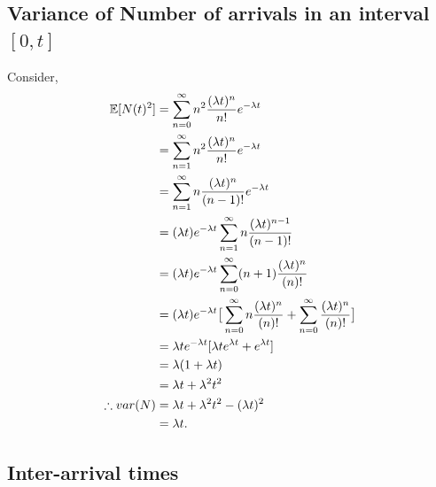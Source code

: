 \documentclass[11pt, a4paper]{report}
\begin{document}

\subsection{Variance of Number of arrivals in an interval $
[0, t]$}
Consider,
\begin{subequations}
    \begin{align}
        {\mathbb{E}}[N(t)^2] &= \sum_{n=0}^{\infty} n^2 \frac{(\lambda t)^n}{n!}e^{-\lambda t} \\
        &= \sum_{n=1}^{\infty} n^2 \frac{(\lambda t)^n}{n!}e^{-\lambda t} \\
        &= \sum_{n=1}^{\infty} n \frac{(\lambda t)^n}{(n-1)!}e^{-\lambda t} \\
        &= (\lambda t)e^{-\lambda t} \sum_{n=1}^{\infty}n \frac{(\lambda t)^{n-1}}{(n-1)!} \\
        &= (\lambda t)e^{-\lambda t} \sum_{n=0}^{\infty}(n+1) \frac{(\lambda t)^{n}}{(n)!} \\
        &= (\lambda t)e^{-\lambda t} \big[\sum_{n=0}^{\infty}n \frac{(\lambda t)^{n}}{(n)!}+ \sum_{n=0}^{\infty} \frac{(\lambda t)^{n}}{(n)!}\big] \\
        &= \lambda t e^{-\lambda t} [\lambda t e ^{\lambda t} + e^{\lambda t}] \\
        &= \lambda (1 + \lambda t) \\
        &= \lambda t + \lambda^2 t^2 \\
        \therefore var(N) &= \lambda t + \lambda^2 t^2 - (\lambda t)^2 \\
        &= \lambda t.
    \end{align}
    \label{eq:varArrivals}
\end{subequations}

\subsection{Inter-arrival times}
\end{document}
